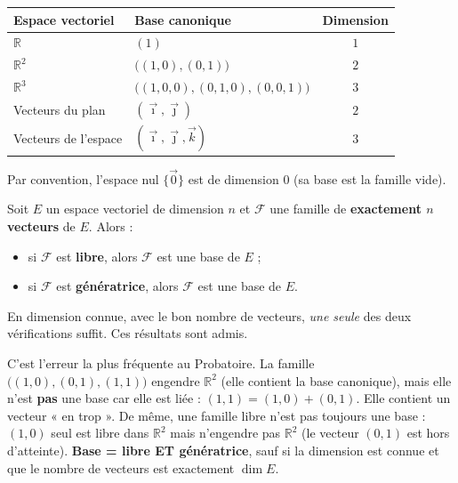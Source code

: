 \documentclass[11pt]{article}
\begin{document}
\begin{aretenir}
\begin{center}
\begin{tabularx}{\linewidth}{|l|X|c|}
\hline
\rowcolor{popblueL} \textbf{Espace vectoriel} & \textbf{Base canonique} & \textbf{Dimension} \\
\hline
$\mathbb{R}$ & $(1)$ & $1$ \\
\hline
$\mathbb{R}^2$ & $\big((1,0),(0,1)\big)$ & $2$ \\
\hline
$\mathbb{R}^3$ & $\big((1,0,0),(0,1,0),(0,0,1)\big)$ & $3$ \\
\hline
Vecteurs du plan & $(\vec{\imath}, \vec{\jmath})$ & $2$ \\
\hline
Vecteurs de l'espace & $(\vec{\imath}, \vec{\jmath}, \vec{k})$ & $3$ \\
\hline
\end{tabularx}
\end{center}
Par convention, l'espace nul $\{\vec{0}\}$ est de dimension $0$ (sa base est la famille vide).
\end{aretenir}

\begin{propriete}
Soit $E$ un espace vectoriel de dimension $n$ et $\mathcal{F}$ une famille de \textbf{exactement $n$ vecteurs} de $E$. Alors :
\begin{itemize}
\item si $\mathcal{F}$ est \textbf{libre}, alors $\mathcal{F}$ est une base de $E$ ;
\item si $\mathcal{F}$ est \textbf{génératrice}, alors $\mathcal{F}$ est une base de $E$.
\end{itemize}
En dimension connue, avec le bon nombre de vecteurs, \emph{une seule} des deux vérifications suffit. Ces résultats sont admis.
\end{propriete}

\begin{attention}
C'est l'erreur la plus fréquente au Probatoire. La famille $\big((1,0), (0,1), (1,1)\big)$ engendre $\mathbb{R}^2$ (elle contient la base canonique), mais elle n'est \textbf{pas} une base car elle est liée : $(1,1) = (1,0) + (0,1)$. Elle contient un vecteur « en trop ». De même, une famille libre n'est pas toujours une base : $(1,0)$ seul est libre dans $\mathbb{R}^2$ mais n'engendre pas $\mathbb{R}^2$ (le vecteur $(0,1)$ est hors d'atteinte). \textbf{Base = libre ET génératrice}, sauf si la dimension est connue et que le nombre de vecteurs est exactement $\dim E$.
\end{attention}
\end{document}
